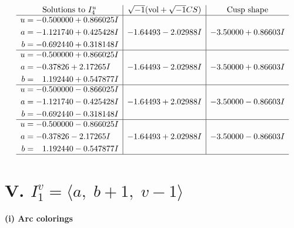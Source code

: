 \documentclass[1p]{elsarticle_modified}
\theoremstyle{definition}
\newcommand{\I}{\sqrt{-1}}
\begin{document}
$$\begin{array}{c|c|c}  
\text{Solutions to }I^u_{4}& \I (\text{vol} + \sqrt{-1}CS) & \text{Cusp shape}\\
 \hline 
\begin{aligned}
u &= -0.500000 + 0.866025 I \\
a &= -1.121740 + 0.425428 I \\
b &= -0.692440 + 0.318148 I\end{aligned}
 & -1.64493 - 2.02988 I & -3.50000 + 0.86603 I \\ \hline\begin{aligned}
u &= -0.500000 + 0.866025 I \\
a &= -0.37826 + 2.17265 I \\
b &= \phantom{-}1.192440 + 0.547877 I\end{aligned}
 & -1.64493 - 2.02988 I & -3.50000 + 0.86603 I \\ \hline\begin{aligned}
u &= -0.500000 - 0.866025 I \\
a &= -1.121740 - 0.425428 I \\
b &= -0.692440 - 0.318148 I\end{aligned}
 & -1.64493 + 2.02988 I & -3.50000 - 0.86603 I \\ \hline\begin{aligned}
u &= -0.500000 - 0.866025 I \\
a &= -0.37826 - 2.17265 I \\
b &= \phantom{-}1.192440 - 0.547877 I\end{aligned}
 & -1.64493 + 2.02988 I & -3.50000 - 0.86603 I\\
 \hline 
 \end{array}$$\newpage\newpage\renewcommand{\arraystretch}{1}
\centering \section*{V. $I^v_{1}= \langle a,\;b+1,\;v-1 \rangle$}
\flushleft \textbf{(i) Arc colorings}\\
\end{document}
